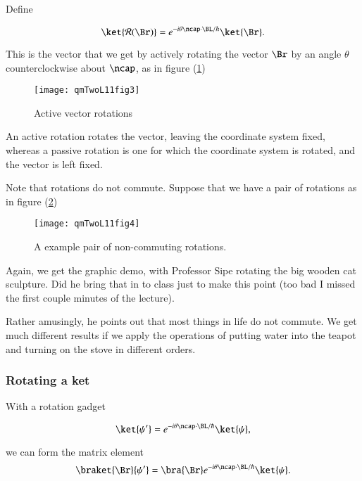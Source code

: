 Define 

\begin{equation}\label{eqn:qmTwoL11:350}
\ket{\mathcal{R}(\Br)} = 
e^{-i \theta \ncap \cdot \BL/\hbar}
\ket{\Br} .
\end{equation}

This is the vector that we get by actively rotating the vector $\Br$ by an angle $\theta$ counterclockwise about $\ncap$, as in figure (\ref{fig:qmTwoL11:qmTwoL11fig3})

\begin{figure}[htp]
   \centering
   \texttt{[image: qmTwoL11fig3]}
   \caption{Active vector rotations}\label{fig:qmTwoL11:qmTwoL11fig3}
\end{figure}

An active rotation rotates the vector, leaving the coordinate system fixed, whereas a passive rotation is one for which the coordinate system is rotated, and the vector is left fixed.

Note that rotations do not commute.  Suppose that we have a pair of rotations as in figure (\ref{fig:qmTwoL11:qmTwoL11fig4})
\begin{figure}[htp]
   \centering
   \texttt{[image: qmTwoL11fig4]}
   \caption{A example pair of non-commuting rotations.}\label{fig:qmTwoL11:qmTwoL11fig4}
\end{figure}

Again, we get the graphic demo, with Professor Sipe rotating the big wooden cat sculpture.  Did he bring that in to class just to make this point (too bad I missed the first couple minutes of the lecture).

Rather amusingly, he points out that most things in life do not commute.  We get much different results if we apply the operations of putting water into the teapot and turning on the stove in different orders.

\subsubsection{Rotating a ket}

With a rotation gadget

\begin{equation}\label{eqn:qmTwoL11:370}
\ket{\psi'} = 
e^{-i \theta \ncap \cdot \BL/\hbar }
\ket{\psi},
\end{equation}

we can form the matrix element
\begin{equation}\label{eqn:qmTwoL11:390}
\braket{\Br}{\psi'} = 
\bra{\Br} e^{-i \theta \ncap \cdot \BL/\hbar }
\ket{\psi}.
\end{equation}

